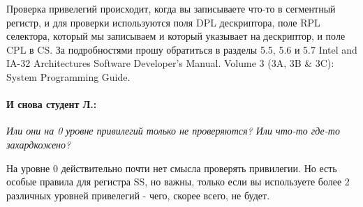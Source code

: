 Проверка привелегий происходит, когда вы записываете что-то в сегментный
регистр, и для проверки используются поля DPL дескриптора, поле RPL селектора,
который мы записываем и который указывает на дескриптор, и поле CPL в CS. За
подробностями прошу обратиться в разделы 5.5, 5.6 и 5.7 Intel
and IA-32 Architectures Software Developer's Manual. Volume 3 (3A, 3B \& 3C):
System Programming Guide.

\paragraph{И снова студент Л.:}\emph{Или они на 0 уровне привилегий только не
проверяются? Или что-то где-то захардкожено?}

На уровне 0 действительно почти нет смысла проверять привилегии. Но есть особые
правила для регистра SS, но важны, только если вы используете более 2 различных
уровней привелегий - чего, скорее всего, не будет.
